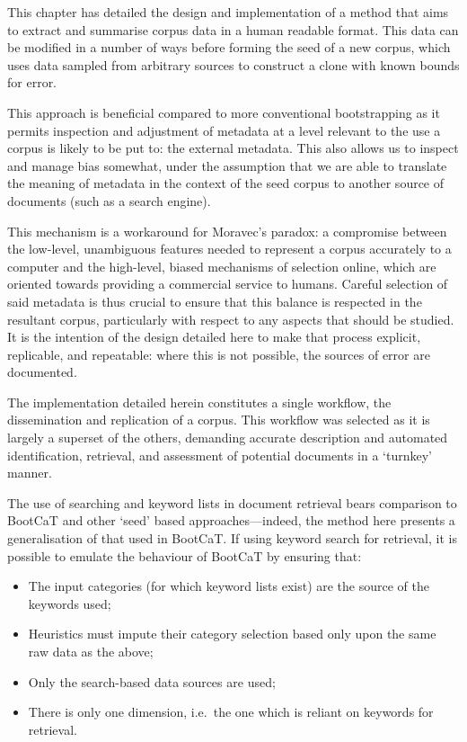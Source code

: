 

This chapter has detailed the design and implementation of a method that aims to extract and summarise corpus data in a human readable format.  This data can be modified in a number of ways before forming the seed of a new corpus, which uses data sampled from arbitrary sources to construct a clone with known bounds for error.

This approach is beneficial compared to more conventional bootstrapping as it permits inspection and adjustment of metadata at a level relevant to the use a corpus is likely to be put to: the external metadata.  This also allows us to inspect and manage bias somewhat, under the assumption that we are able to translate the meaning of metadata in the context of the seed corpus to another source of documents (such as a search engine).

This mechanism is a workaround for Moravec's paradox\cite{moravec1988mind}: a compromise between the low-level, unambiguous features needed to represent a corpus accurately to a computer and the high-level, biased mechanisms of selection online, which are oriented towards providing a commercial service to humans.  Careful selection of said metadata is thus crucial to ensure that this balance is respected in the resultant corpus, particularly with respect to any aspects that should be studied.  It is the intention of the design detailed here to make that process explicit, replicable, and repeatable: where this is not possible, the sources of error are documented.

The implementation detailed herein constitutes a single workflow, the dissemination and replication of a corpus.  This workflow was selected as it is largely a superset of the others, demanding accurate description and automated identification, retrieval, and assessment of potential documents in a `turnkey' manner.




The use of searching and keyword lists in document retrieval bears comparison to BootCaT and other `seed' based approaches---indeed, the method here presents a generalisation of that used in BootCaT.  If using keyword search for retrieval, it is possible to emulate the behaviour of BootCaT by ensuring that:

\begin{itemize}
    \item The input categories (for which keyword lists exist) are the source of the keywords used;
    \item Heuristics must impute their category selection based only upon the same raw data as the above;
    \item Only the search-based data sources are used;
    \item There is only one dimension, i.e.\ the one which is reliant on keywords for retrieval.
\end{itemize}

